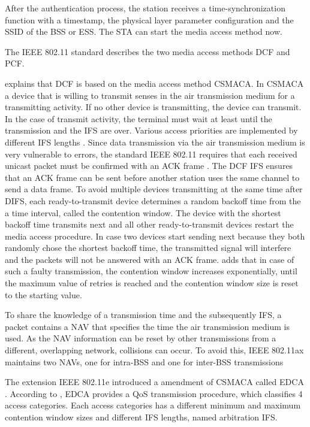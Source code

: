 After the authentication process, the station receives a time-synchronization function with a timestamp, the physical layer
parameter configuration and the \ac{SSID} of the \ac{BSS} or \ac{ESS}.
The \ac{STA} can start the media access method now.

The IEEE 802.11 standard describes the two media access methods \ac{DCF} and \ac{PCF}.

\textcite{sauter_wireless_2022} explains that \ac{DCF} is based on the media access method \ac{CSMACA}.
In \ac{CSMACA} a device that is willing to transmit senses in the air transmission medium for a transmitting activity.
If no other device is transmitting, the device can transmit.
In the case of transmit activity, the terminal must wait at least until the transmission and the \ac{IFS} are over.
Various access priorities are implemented by different \ac{IFS} lengths \cite{Sommer}.
Since data transmission via the air transmission medium is very vulnerable to errors,
the standard IEEE 802.11 requires that each received unicast packet must be confirmed with an \ac{ACK} frame \cite{sommer_vehicular}.
The \ac{DCF} \ac{IFS} ensures that an \ac{ACK} frame can be sent before another station uses the same channel to send a data frame.
To avoid multiple devices transmitting at the same time after \ac{DIFS}, each ready-to-transmit device determines
a random backoff time from the a time interval, called the contention window.
The device with the shortest backoff time transmits next and all other ready-to-transmit devices restart the media access procedure.
In case two devices start sending next because they both randomly chose the shortest backoff time,
the transmitted signal will interfere and the packets will not be answered with an \ac{ACK} frame.
\textcite{SOmmer} adds that in case of such a faulty transmission, the contention window increases exponentially, until the maximum value of retries is reached and
the contention window size is reset to the starting value.

To share the knowledge of a transmission time and the subsequently \ac{IFS}, a packet contains a \ac{NAV} that
specifies the time the air transmission medium is used.
As the \ac{NAV} information can be reset by other transmissions from a different, overlapping network, collisions can occur.
To avoid this, IEEE 802.11ax maintains two \ac{NAV}s, one for intra-\ac{BSS} and one for inter-\ac{BSS} transmissions \cite{noauthor_ieee_2021}

The extension IEEE 802.11e introduced a amendment of \ac{CSMACA} called \ac{EDCA} \cite{Sommer} \cite{EDCA}.
According to \textcite{Sommer}, \ac{EDCA} provides a \ac{QoS} transmission procedure, which classifies \num{4} access categories.
Each access categories has a different minimum and maximum contention window sizes and different \ac{IFS} lengths, named
arbitration \ac{IFS}.


